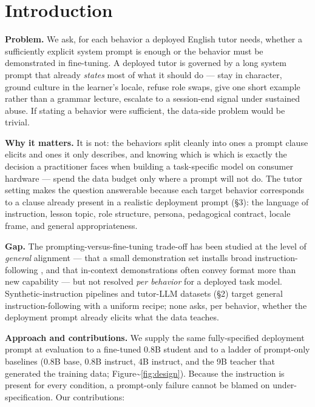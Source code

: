 \section{Introduction}\label{introduction}

\textbf{Problem.} We ask, for each behavior a deployed English tutor
needs, whether a sufficiently explicit system prompt is enough or the
behavior must be demonstrated in fine-tuning. A deployed tutor is
governed by a long system prompt that already \emph{states} most of what
it should do --- stay in character, ground culture in the learner's
locale, refuse role swaps, give one short example rather than a grammar
lecture, escalate to a session-end signal under sustained abuse. If
stating a behavior were sufficient, the data-side problem would be
trivial.

\textbf{Why it matters.} It is not: the behaviors split cleanly into
ones a prompt clause elicits and ones it only describes, and knowing
which is which is exactly the decision a practitioner faces when
building a task-specific model on consumer hardware --- spend the data
budget only where a prompt will not do. The tutor setting makes the
question answerable because each target behavior corresponds to a clause
already present in a realistic deployment prompt (§3): the language of
instruction, lesson topic, role structure, persona, pedagogical
contract, locale frame, and general appropriateness.

\textbf{Gap.} The prompting-versus-fine-tuning trade-off has been
studied at the level of \emph{general} alignment --- that a small
demonstration set installs broad instruction-following
\citep{zhou2023lima, ouyang2022instructgpt}, and that in-context
demonstrations often convey format more than new capability
\citep{min2022rethinking} --- but not resolved \emph{per behavior} for a
deployed task model. Synthetic-instruction pipelines and tutor-LLM
datasets (§2) target general instruction-following with a uniform
recipe; none asks, per behavior, whether the deployment prompt already
elicits what the data teaches.

\textbf{Approach and contributions.} We supply the same fully-specified
deployment prompt at evaluation to a fine-tuned 0.8B student and to a
ladder of prompt-only baselines (0.8B base, 0.8B instruct, 4B instruct,
and the 9B teacher that generated the training data;
Figure\textasciitilde{}\ref{fig:design}). Because the instruction is
present for every condition, a prompt-only failure cannot be blamed on
under-specification. Our contributions:

